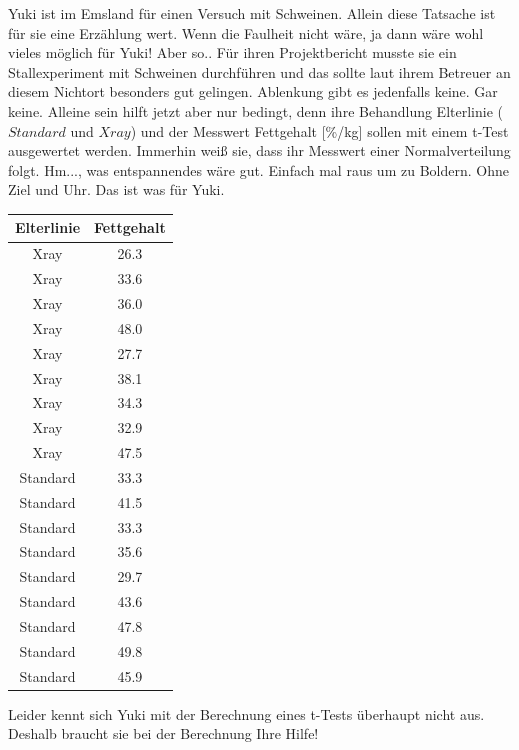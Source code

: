 \documentclass[a4paper, 9pt]{scrartcl}\usepackage[]{graphicx}\usepackage[]{xcolor}
\begin{document}
Yuki ist im Emsland für einen Versuch mit Schweinen. Allein diese Tatsache ist für sie eine Erzählung wert. Wenn die Faulheit nicht wäre, ja dann wäre wohl vieles möglich für Yuki! Aber so.. Für ihren Projektbericht musste sie ein Stallexperiment mit Schweinen durchführen und das sollte laut ihrem Betreuer an diesem Nichtort besonders gut gelingen. Ablenkung gibt es jedenfalls keine. Gar keine. Alleine sein hilft jetzt aber nur bedingt, denn ihre Behandlung Elterlinie ($Standard$ und $Xray$) und der Messwert Fettgehalt [\%/kg] sollen mit einem t-Test ausgewertet werden. Immerhin weiß sie, dass ihr Messwert einer Normalverteilung folgt. Hm..., was entspannendes wäre gut. Einfach mal raus um zu Boldern. Ohne Ziel und Uhr. Das ist was für Yuki.

\begin{table}[!h]
\centering
\begin{tabular}{cc}
\toprule
Elterlinie & Fettgehalt\\
\midrule
Xray & 26.3\\
Xray & 33.6\\
Xray & 36.0\\
Xray & 48.0\\
Xray & 27.7\\
\addlinespace
Xray & 38.1\\
Xray & 34.3\\
Xray & 32.9\\
Xray & 47.5\\
Standard & 33.3\\
\addlinespace
Standard & 41.5\\
Standard & 33.3\\
Standard & 35.6\\
Standard & 29.7\\
Standard & 43.6\\
\addlinespace
Standard & 47.8\\
Standard & 49.8\\
Standard & 45.9\\
\bottomrule
\end{tabular}
\end{table}



Leider kennt sich Yuki mit der Berechnung eines t-Tests überhaupt nicht aus. Deshalb braucht sie bei der Berechnung Ihre Hilfe!
\end{document}
